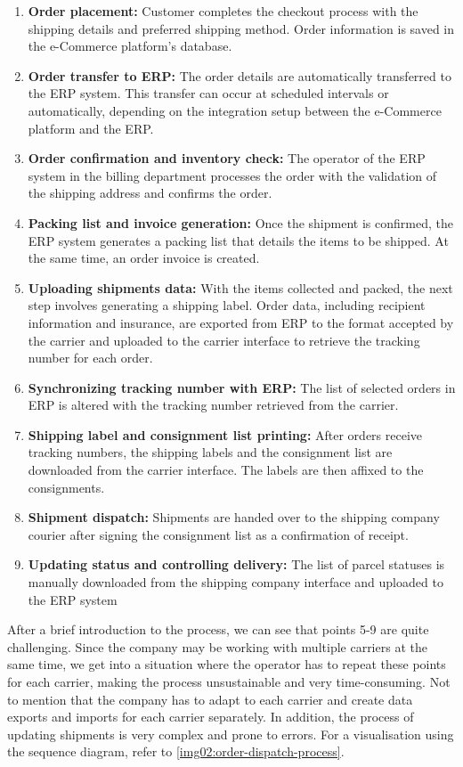 \begin{enumerate}
    \item \textbf{Order placement:} Customer completes the checkout process with the shipping details and preferred shipping method. Order information is saved in the e-Commerce platform's database.
    \item \textbf{Order transfer to \ac{ERP}:} The order details are automatically transferred to the \ac{ERP} system. This transfer can occur at scheduled intervals or automatically, depending on the integration setup between the e-Commerce platform and the \ac{ERP}.
    \item \textbf{Order confirmation and inventory check:} The operator of the ERP system in the billing department processes the order with the validation of the shipping address and confirms the order.
    \item \textbf{Packing list and invoice generation:} Once the shipment is confirmed, the \ac{ERP} system generates a packing list that details the items to be shipped. At the same time, an order invoice is created.
    \item \textbf{Uploading shipments data:} With the items collected and packed, the next step involves generating a shipping label. Order data, including recipient information and insurance, are exported from \ac{ERP} to the format accepted by the carrier and uploaded to the carrier interface to retrieve the tracking number for each order.
    \item \textbf{Synchronizing tracking number with \ac{ERP}:} The list of selected orders in \ac{ERP} is altered with the tracking number retrieved from the carrier.
    \item \textbf{Shipping label and consignment list printing:} After orders receive tracking numbers, the shipping labels and the consignment list are downloaded from the carrier interface. The labels are then affixed to the consignments.
    \item \textbf{Shipment dispatch:} Shipments are handed over to the shipping company courier after signing the consignment list as a confirmation of receipt. 
    \item \textbf{Updating status and controlling delivery:} The list of parcel statuses is manually downloaded from the shipping company interface and uploaded to the \ac{ERP} system
\end{enumerate}


After a brief introduction to the process, we can see that points 5-9 are quite challenging.
Since the company may be working with multiple carriers at the same time, we get into a situation where the operator has to repeat these points for each carrier, making the process unsustainable and very time-consuming.
Not to mention that the company has to adapt to each carrier and create data exports and imports for each carrier separately.
In addition, the process of updating shipments is very complex and prone to errors.
For a visualisation using the sequence diagram, refer to \ref{img02:order-dispatch-process}.


